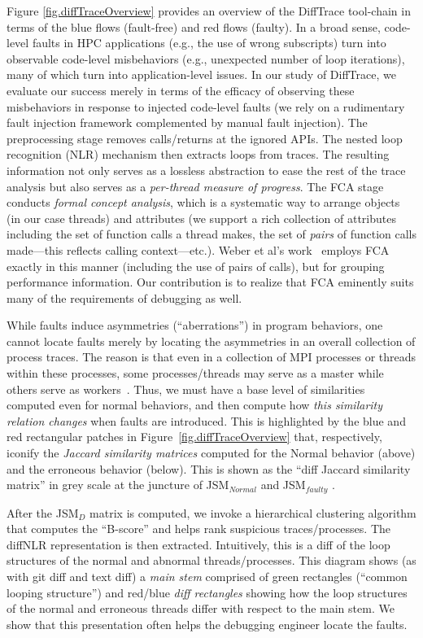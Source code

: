 Figure \ref{fig.diffTraceOverview} provides an overview
of the DiffTrace tool-chain
in terms of the blue flows (fault-free) and red flows
(faulty).
%
In a broad sense,
code-level faults in HPC applications (e.g.,
the use of wrong subscripts) turn into observable code-level
misbehaviors
(e.g., unexpected number of loop iterations), many of which
turn into application-level issues.
%
In our study of DiffTrace, we evaluate
our success merely in terms of the efficacy of observing
these misbehaviors in response to injected code-level
faults (we rely on a rudimentary fault injection framework
complemented by manual fault injection).
%
The preprocessing stage removes calls/returns at the ignored APIs.
%
The nested loop recognition (NLR)
mechanism then extracts loops from traces.
The resulting information not only
serves as a lossless abstraction to
ease the rest of the trace analysis but also
serves as a {\em per-thread measure of progress}.
%
The FCA stage conducts {\em formal concept analysis}, which
is a systematic way to arrange objects (in our case threads)
and attributes (we support a rich collection of attributes
including the set of function calls a thread makes, the
set of {\em pairs} of function calls made---this reflects calling
context---etc.).
%
Weber et al's work~\cite{weberStructural,clbook} employs FCA exactly in
this manner (including the use of pairs of calls),
but for grouping performance information.
%
Our contribution is to realize that FCA eminently suits many
of the requirements of debugging as well.


While faults induce asymmetries (``aberrations'') in program behaviors,
one cannot locate faults merely by locating the asymmetries in
an overall collection of process traces.
%
The reason is that even in a collection of MPI processes or threads within
these processes, some processes/threads may serve as a master while others
serve as workers~\cite{patterns-for-par-prog-mattson}.
%
Thus, we must have a base level of similarities computed even for normal
behaviors, and then compute how {\em this similarity relation changes} when
faults are introduced.
%
This is highlighted by
the blue and red rectangular patches in
Figure~\ref{fig.diffTraceOverview} that, respectively,
iconify the {\em Jaccard similarity
  matrices} computed for the Normal behavior (above) and
the erroneous behavior (below).
%
This is shown as
the ``diff Jaccard similarity matrix'' in grey scale at the
juncture of JSM$_{Normal}$  and JSM$_{faulty}$ .


After the JSM$_{D}$ matrix is computed, we 
invoke a hierarchical clustering algorithm that computes the ``B-score''
and helps rank suspicious traces/processes.
%
The diffNLR representation is then extracted.
%
Intuitively, this is a diff of the loop structures of the normal and abnormal
threads/processes.
%
This diagram shows (as with git diff and text diff) a {\em main stem} comprised of green rectangles
(``common looping structure'') and red/blue {\em diff rectangles} showing how the loop structures of
the normal and erroneous threads differ with respect to the main stem.
%
We show that this presentation often helps the debugging engineer
locate the faults.




